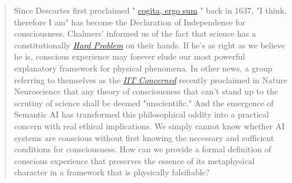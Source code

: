 \documentclass[runningheads]{llncs}
\newcommand{\hidden}[2]{\href{#1}{#2}}
\newcommand{\CogitoEroSum}[0]{%
\hidden{https://en.wikipedia.org/wiki/Cogito,_ergo_sum}{cogita, ergo sum}%
}
\newcommand{\IITConcerned}[0]{%
\hidden{https://www.nature.com/articles/s41593-025-01881-x.epdf?sharing_token=FO9AlF2XxStF0f0ZkCxVO9RgN0jAjWel9jnR3ZoTv0Ouhh6rkPmgTYfvVoAl0306uZC5D8oDahGAsQsrm-HalpnyuXbvfZ2UsrGn2XfsmcqAVSpVdrTlpql7Q__Ss82bM7AaHSvbqtQUBhRyY8iN6Jwymr9YMBUHoeqDasHVsW4\%3D}{IIT Concerned}%
}
\newcommand{\HardProblemHide}[1]{%
\hidden{http://consc.net/papers/facing.pdf}{#1}%
}
\begin{document}
\begin{abstract}
Since Descartes first proclaimed "\CogitoEroSum" back in 1637, "I think, therefore I am" has become the Declaration of Independence for consciousness. Chalmers' informed us of the fact that science has a constitutionally \HardProblemHide{\textit{Hard Problem}} on their hands. If he's as right as we believe he is, conscious experience may forever elude our most powerful explanatory framework for physical phenomena. In other news, a group referring to themselves as the \textit{\IITConcerned} recently proclaimed in Nature Neuroscience that any theory of consciousness that can't stand up to the scrutiny of science shall be deemed "unscientific." And the emergence of Semantic AI has transformed this philosophical oddity into a practical concern with real ethical implications. We simply cannot know whether AI systems are conscious without first knowing the necessary and sufficient conditions for consciousness. How can we provide a formal definition of conscious experience that preserves the essence of its metaphysical character in a framework that is physically falsifiable? 

\end{abstract}
\end{document}

